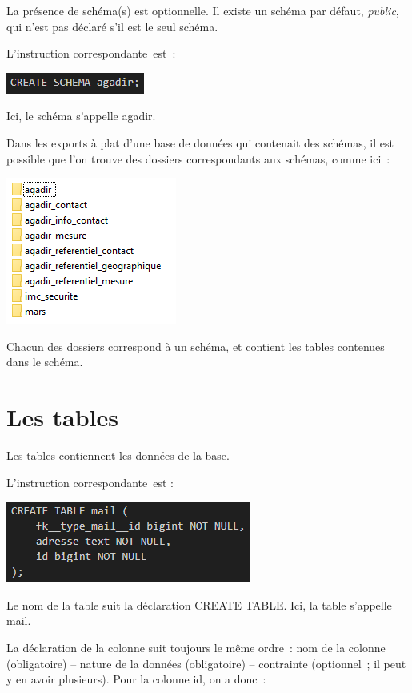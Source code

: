 La présence de schéma(s) est optionnelle. Il existe un schéma par
défaut, \emph{public}, qui n'est pas déclaré s'il est le seul schéma.

L'instruction correspondante~est~:

\includegraphics{annexes/image3.png}

Ici, le schéma s'appelle agadir.

Dans les exports à plat d'une base de données qui contenait des schémas,
il est possible que l'on trouve des dossiers correspondants aux schémas,
comme ici~:

\includegraphics{annexes/image4.png}

Chacun des dossiers correspond à un schéma, et contient les tables
contenues dans le schéma.

\section*{Les tables}

Les tables contiennent les données de la base.

L'instruction correspondante~est :

\includegraphics{annexes/image5.png}

Le nom de la table suit la déclaration CREATE TABLE. Ici, la table
s'appelle mail.

La déclaration de la colonne suit toujours le même ordre~: nom de la
colonne (obligatoire) -- nature de la données (obligatoire) --
contrainte (optionnel~; il peut y en avoir plusieurs). Pour la colonne
id, on a donc~:

